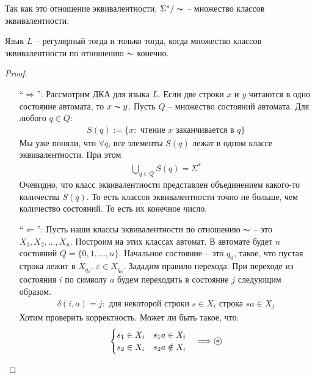 Так как это отношение эквивалентности, $\Sigma^* / \thicksim$ -- множество классов эквивалентности. 

\begin{theorem}
    Язык $L$ -- регулярный тогда и только тогда, когда множество классов эквивалентности по отношению $\thicksim$ конечно.
\end{theorem}
\begin{proof} \quad

    \begin{enumerate}
        \item[``$\Longrightarrow$'':] Рассмотрим ДКА для языка $L$. Если две строки $x$ и $y$ читаются в одно состояние автомата, то $x \thicksim y$. Пусть $Q$ -- множество состояний автомата. Для любого $q \in Q$:
        \begin{gather*}
            S(q) := \{x : \text{ чтение $x$ заканчивается в $q$} \}
        \end{gather*}
        Мы уже поняли, что $\forall q$, все элементы $S(q)$ лежат в одном классе эквивалентности. При этом 
        \begin{gather*}
            \bigcup\limits_{q \in Q} S(q) = \Sigma^*
        \end{gather*}
        Очевидно, что класс эквивалентности представлен объединением какого-то количества $S(q)$. То есть классов эквивалентности точно не больше, чем количество состояний. То есть их конечное число.
        \item[``$\Longleftarrow$'':] Пусть наши классы эквивалентности по отношению $\thicksim$ -- это $X_1, X_2, \dots, X_n$. Построим на этих классах автомат. В автомате будет $n$ состояний $Q = \{0, 1, \dots, n\}$. Начальное состояние -- это $q_0$, такое, что пустая строка лежит в $X_{q_0}$. $\varepsilon \in X_{q_0}$. Зададим правило перехода. При переходе из состояния $i$ по символу $a$ будем переходить в состояние $j$ следующим образом. 
        \begin{gather*}
            \delta(i, a) = j : \text{ для некоторой строки } s \in X_i \text{ строка } sa \in X_j
        \end{gather*}
        Хотим проверить корректность. Может ли быть такое, что: 
        \begin{gather*}
            \begin{cases}
                s_1 \in X_i \quad s_1 a \in X_i \\
                s_2 \in X_i \quad s_2 a \notin X_i
            \end{cases} \Longrightarrow \oast

\end{gather*}
\end{enumerate}
\end{proof}
